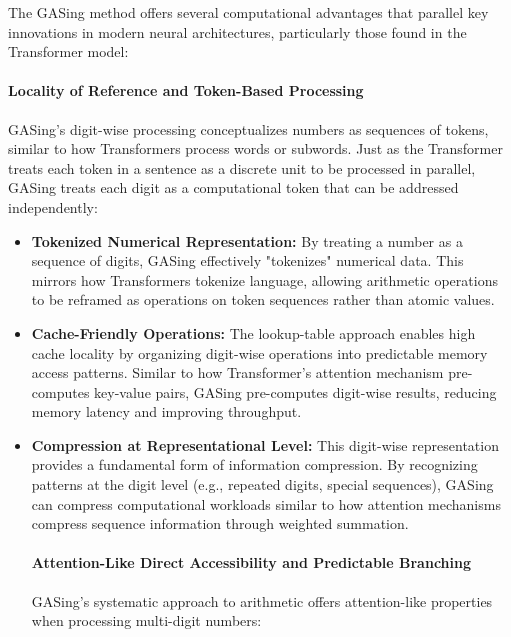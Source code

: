The GASing method offers several computational advantages that parallel key innovations in modern neural architectures, particularly those found in the Transformer model:
\paragraph{Locality of Reference and Token-Based Processing}

GASing's digit-wise processing conceptualizes numbers as sequences of tokens, similar to how Transformers process words or subwords. Just as the Transformer treats each token in a sentence as a discrete unit to be processed in parallel, GASing treats each digit as a computational token that can be addressed independently:
\begin{itemize}
\item \textbf{\textbf{Tokenized Numerical Representation}:} By treating a number as a sequence of digits, GASing effectively "tokenizes" numerical data. This mirrors how Transformers tokenize language, allowing arithmetic operations to be reframed as operations on token sequences rather than atomic values.
\end{itemize}

\begin{itemize}
\item \textbf{\textbf{Cache-Friendly Operations}:} The lookup-table approach enables high cache locality by organizing digit-wise operations into predictable memory access patterns. Similar to how Transformer's attention mechanism pre-computes key-value pairs, GASing pre-computes digit-wise results, reducing memory latency and improving throughput.
\end{itemize}

\begin{itemize}
\item \textbf{\textbf{Compression at Representational Level}:} This digit-wise representation provides a fundamental form of information compression. By recognizing patterns at the digit level (e.g., repeated digits, special sequences), GASing can compress computational workloads similar to how attention mechanisms compress sequence information through weighted summation.

\vspace{0.5em}
\noindent\hspace{2em}\paragraph{Attention-Like Direct Accessibility and Predictable Branching}  GASing's systematic approach to arithmetic offers attention-like properties when processing multi-digit numbers:
\vspace{0.5em}

\end{itemize}

